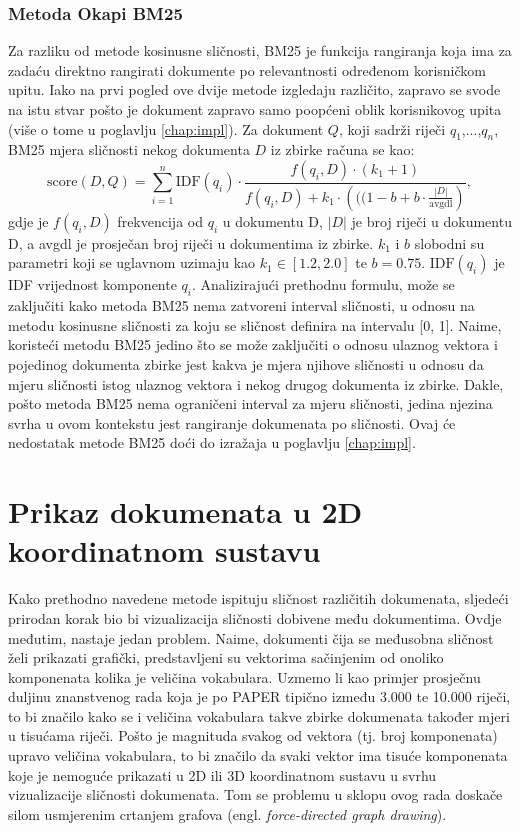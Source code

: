 \documentclass[times, utf8, zavrsni]{fer}
\begin{document}
\subsection{Metoda Okapi BM25}
Za razliku od metode kosinusne sličnosti, BM25 je funkcija rangiranja koja ima za zadaću direktno rangirati dokumente po relevantnosti određenom korisničkom upitu. Iako na prvi pogled ove dvije metode izgledaju različito, zapravo se svode na istu stvar pošto je dokument zapravo samo poopćeni oblik korisnikovog upita (više o tome u poglavlju \ref{chap:impl}).
Za dokument $Q$, koji sadrži riječi $q_{1}$,...,$q_{n}$, BM25 mjera sličnosti nekog dokumenta $D$ iz zbirke računa se kao:
\begin{equation}
{\displaystyle {\text{score}}(D,Q)=\sum _{i=1}^{n}{\text{IDF}}(q_{i})\cdot {\frac {f(q_{i},D)\cdot (k_{1}+1)}{f(q_{i},D)+k_{1}\cdot \left(((1-b+b\cdot {\frac {|D|}{\text{avgdl}}}\right)}},}
\end{equation}
gdje je ${\displaystyle f(q_{i},D)}$	 frekvencija od ${\displaystyle q_{i}}$ u dokumentu D, ${\displaystyle |D|}$ je broj riječi u dokumentu D, a avgdl je prosječan broj riječi u dokumentima iz zbirke. ${\displaystyle k_{1}}$ i $b$ slobodni su parametri koji se uglavnom uzimaju kao ${\displaystyle k_{1}\in [1.2,2.0]}$ te ${\displaystyle b=0.75}.{\displaystyle {\text{ IDF}}(q_{i})}$ je IDF vrijednost komponente ${\displaystyle q_{i}}$.
Analizirajući prethodnu formulu, može se zaključiti kako metoda BM25 nema zatvoreni interval sličnosti, u odnosu na metodu kosinusne sličnosti za koju se sličnost definira na intervalu [0, 1]. Naime, koristeći metodu BM25 jedino što se može zaključiti o odnosu ulaznog vektora i pojedinog dokumenta zbirke jest kakva je mjera njihove sličnosti u odnosu da mjeru sličnosti istog ulaznog vektora i nekog drugog dokumenta iz zbirke. Dakle, pošto metoda BM25 nema ograničeni interval za mjeru sličnosti, jedina njezina svrha u ovom kontekstu jest rangiranje dokumenata po sličnosti. Ovaj će nedostatak metode BM25 doći do izražaja u poglavlju \ref{chap:impl}.

\chapter{Prikaz dokumenata u 2D koordinatnom sustavu}
Kako prethodno navedene metode ispituju sličnost različitih dokumenata, sljedeći prirodan korak bio bi vizualizacija  sličnosti dobivene među dokumentima. Ovdje međutim, nastaje jedan problem. Naime, dokumenti čija se međusobna sličnost želi prikazati grafički, predstavljeni su vektorima sačinjenim od onoliko komponenata kolika je veličina vokabulara. Uzmemo li kao primjer prosječnu duljinu znanstvenog rada koja je po PAPER tipično između 3.000 te 10.000 riječi, to bi značilo kako se i veličina vokabulara takve zbirke dokumenata također mjeri u tisućama riječi. Pošto je magnituda svakog od vektora (tj. broj komponenata) upravo veličina vokabulara, to bi značilo da svaki vektor ima tisuće komponenata koje je nemoguće prikazati u 2D ili 3D koordinatnom sustavu u svrhu vizualizacije sličnosti dokumenata. Tom se problemu u sklopu ovog rada doskače silom usmjerenim crtanjem grafova (engl. \textit{force-directed graph drawing}).
\end{document}
